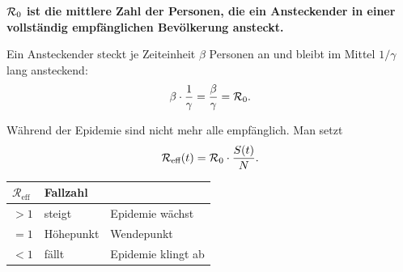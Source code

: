 \begin{merksatz}
\begin{center}
\begin{minipage}{0.9\textwidth}
\textbf{$\mathcal{R}_0$ ist die mittlere Zahl der Personen, die ein Ansteckender in einer vollständig empfänglichen Bevölkerung ansteckt.}
\end{minipage}
\end{center}

Ein Ansteckender steckt je Zeiteinheit $\beta$ Personen an und bleibt im Mittel $1/\gamma$ lang ansteckend:
\[ \beta \cdot \frac{1}{\gamma} = \frac{\beta}{\gamma} = \mathcal{R}_0 . \]

Während der Epidemie sind nicht mehr alle empfänglich. Man setzt
\[ \mathcal{R}_{\text{eff}}(t) = \mathcal{R}_0\cdot\frac{S(t)}{N} . \]

\begin{center}
\renewcommand{\arraystretch}{1.48}
\begin{tabular}{@{}P{2.6cm}P{2.6cm}P{2.8cm}@{}}
\toprule
$\mathcal{R}_{\text{eff}}$ & \textbf{Fallzahl} & \\
\midrule
$> 1$ & \textcolor{akzent}{steigt} & Epidemie wächst\\
$= 1$ & \textcolor{mittel}{Höhepunkt} & Wendepunkt\\
$< 1$ & \textcolor{gruen}{fällt} & Epidemie klingt ab\\
\bottomrule
\end{tabular}
\end{center}

\begin{center}
\begin{minipage}{0.88\textwidth}
\end{minipage}
\end{center}
\end{merksatz}

